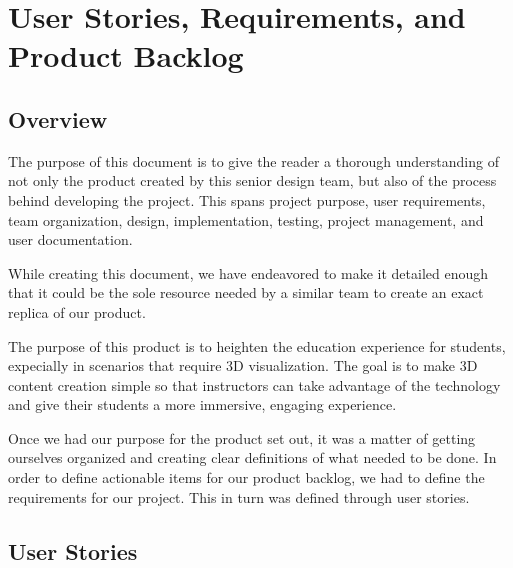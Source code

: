 
\chapter{User Stories,  Requirements, and Product Backlog}



\section{Overview}


The purpose of this document is to give the reader a thorough understanding of
not only the product created by this senior design team, but also of the
process behind developing the project. This spans project purpose, user
requirements, team organization, design, implementation, testing, project
management, and user documentation.

While creating this document, we have endeavored to make it detailed enough
that it could be the sole resource needed by a similar team to create an exact
replica of our product.

The purpose of this product is to heighten the education experience for
students, expecially in scenarios that require 3D visualization. The goal is to
make 3D content creation simple so that instructors can take advantage of the
technology and give their students a more immersive, engaging experience.

Once we had our purpose for the product set out, it was a matter of getting
ourselves organized and creating clear definitions of what needed to be done.
In order to define actionable items for our product backlog, we had to define
the requirements for our project. This in turn was defined through user stories.




\section{User Stories}


